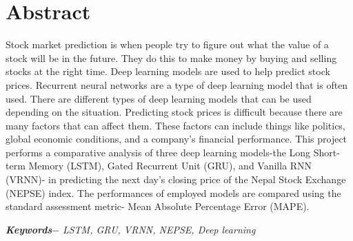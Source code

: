 

\setcounter{tocdepth}{3}
\setcounter{secnumdepth}{3}


\KECcoverpage  
\KECtitlepage
{} %



\chapter*{Abstract} %
Stock market prediction is when people try to figure out what the value of a stock will be in the future. They do this to make money by buying and selling stocks at the right time. Deep learning models are used to help predict stock prices. Recurrent neural networks are a type of deep learning model that is often used. There are different types of deep learning models that can be used depending on the situation. Predicting stock prices is difficult because there are many factors that can affect them. These factors can include things like politics, global economic conditions, and a company's financial performance. This project performs a comparative analysis of three deep learning models-the Long Short-term Memory (LSTM), Gated Recurrent Unit (GRU), and Vanilla RNN (VRNN)- in predicting the next day’s closing price of the Nepal Stock Exchange (NEPSE) index. The performances of employed models are compared using the standard assessment metric- Mean Absolute Percentage Error (MAPE).
\par
\textbf{\textit{Keywords$-$}} \emph{LSTM, GRU, VRNN, NEPSE, Deep learning}

